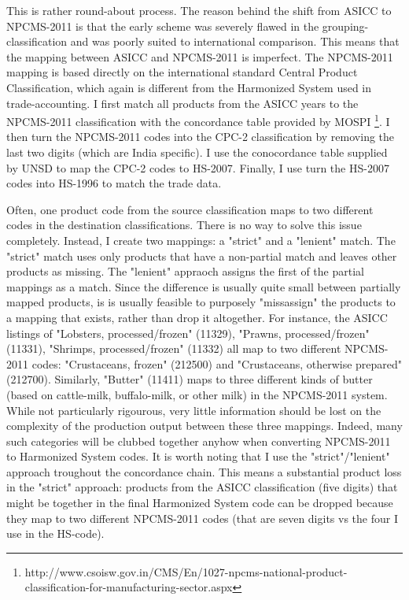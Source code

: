 \documentclass[11pt]{article}
\begin{document}
\begin{appendices}
This is rather round-about process. The reason behind the shift from ASICC to NPCMS-2011 is that the early scheme was severely flawed in the grouping-classification and was poorly suited to international comparison. This means that the mapping between ASICC and NPCMS-2011 is imperfect. The NPCMS-2011 mapping is based directly on the international standard Central Product Classification, which again is different from the Harmonized System used in trade-accounting. I first match all products from the ASICC years to the NPCMS-2011 classification with the concordance table provided by MOSPI \footnote{http://www.csoisw.gov.in/CMS/En/1027-npcms-national-product-classification-for-manufacturing-sector.aspx}. I then turn the NPCMS-2011 codes into the CPC-2 classification by removing the last two digits (which are India specific). I use the conocordance table supplied by UNSD to map the CPC-2 codes to HS-2007. Finally, I use turn the HS-2007 codes into HS-1996 to match the trade data. 

Often, one product code from the source classification maps to two different codes in the destination classifications. There is no way to solve this issue completely. Instead, I create two mappings: a "strict" and a "lenient" match. The "strict" match uses only products that have a non-partial match and leaves other products as missing. The "lenient" appraoch assigns the first of the partial mappings as a match. Since the difference is usually quite small between partially mapped products, is is usually feasible to purposely "missassign" the products to a mapping that exists, rather than drop it altogether. For instance, the ASICC listings of "Lobsters, processed/frozen" (11329), "Prawns, processed/frozen" (11331), "Shrimps, processed/frozen" (11332) all map to two different NPCMS-2011 codes: "Crustaceans, frozen" (212500) and "Crustaceans, otherwise prepared" (212700). Similarly, "Butter" (11411) maps to three different kinds of butter (based on cattle-milk, buffalo-milk, or other milk) in the NPCMS-2011 system. While not particularly rigourous, very little information should be lost on the complexity of the production output between these three mappings. Indeed, many such categories will be clubbed together anyhow when converting NPCMS-2011 to Harmonized System codes. It is worth noting that I use the "strict"/"lenient" approach troughout the concordance chain. This means a substantial product loss in the "strict" approach: products from the ASICC classification (five digits) that might be together in the final Harmonized System code can be dropped because they map to two different NPCMS-2011 codes (that are seven digits vs the four I use in the HS-code).


\end{appendices}
\end{document}
